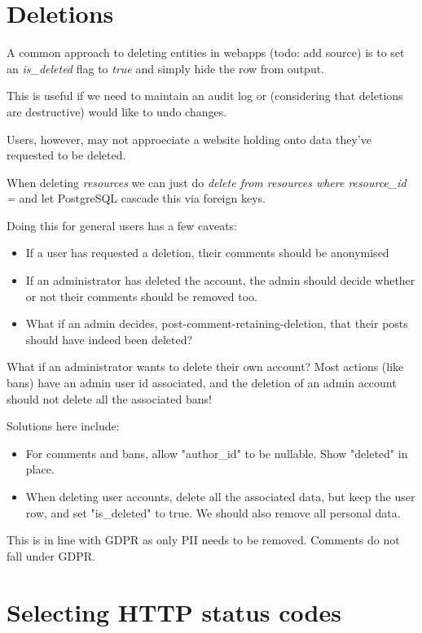 \documentclass[bsc,frontabs,twoside,singlespacing,parskip,deptreport]{infthesis}     %
\begin{document}
\chapter{Deletions}

A common approach to deleting entities in webapps (todo: add source) is to set an \emph{is\_deleted} flag to \emph{true} and simply hide the row from output.

This is useful if we need to maintain an audit log or (considering that deletions
are destructive) would like to undo changes.

Users, however, may not approeciate a website holding onto data they've requested to
be deleted.

When deleting \emph{resources} we can just do \emph{delete from resources where resource\_id = }
and let PostgreSQL cascade this via foreign keys.

Doing this for general users has a few caveats:
\begin{itemize}
  \item If a user has requested a deletion, their comments should be anonymised
  \item If an administrator has deleted the account,
        the admin should decide whether or not their comments should be removed too.
  \item What if an admin decides, post-comment-retaining-deletion, that their posts should have indeed been deleted?
\end{itemize}

What if an administrator wants to delete their own account? Most actions (like bans) have an
admin user id associated, and the deletion of an admin account should not delete all the associated bans!

Solutions here include:

\begin{itemize}
  \item For comments and bans, allow "author\_id" to be nullable. Show "deleted" in place.
  \item When deleting user accounts, delete all the associated data, but keep the user row, and set "is\_deleted" to true. We should also remove all personal data.
\end{itemize}

This is in line with GDPR as only PII needs to be removed. Comments do not fall under GDPR.

\chapter{Selecting HTTP status codes}
\end{document}

